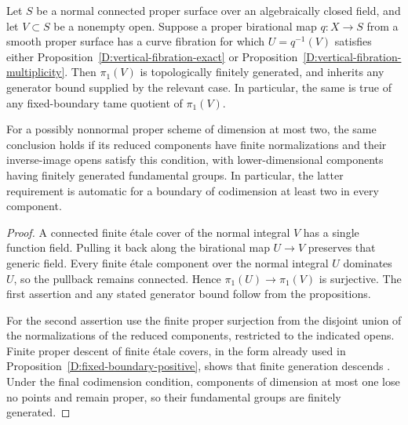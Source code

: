 \begin{corollary}
\label{D:vertical-fibration-models}
Let $S$ be a normal connected proper surface over an
algebraically closed field, and let $V\subset S$ be a nonempty
open.  Suppose a proper birational map $q:X\to S$ from a
smooth proper surface has a curve fibration for which
$U=q^{-1}(V)$ satisfies either
Proposition~\ref{D:vertical-fibration-exact} or
Proposition~\ref{D:vertical-fibration-multiplicity}.
Then $\pi_1(V)$ is topologically finitely generated, and inherits any generator bound supplied by the relevant case.  In particular, the same is
true of any fixed-boundary tame quotient of $\pi_1(V)$.

For a possibly nonnormal proper scheme of dimension at most
two, the same conclusion holds if its reduced components have
finite normalizations and their inverse-image opens satisfy
this condition, with lower-dimensional components having
finitely generated fundamental groups.  In particular, the
latter requirement is automatic for a boundary of codimension
at least two in every component.
\end{corollary}
\begin{proof}
A connected finite \'etale cover of the normal integral $V$
has a single function field.  Pulling it back along the
birational map $U\to V$ preserves that generic field.  Every
finite \'etale component over the normal integral $U$
dominates $U$, so the pullback remains connected.  Hence
$\pi_1(U)\to\pi_1(V)$ is surjective.  The first assertion and any stated generator bound follow from the propositions.

For the second assertion use the finite proper surjection
from the disjoint union of the normalizations of the reduced
components, restricted to the indicated opens.  Finite proper
descent of finite \'etale covers, in the form already used in
Proposition~\ref{D:fixed-boundary-positive}, shows that finite
generation descends
\cite[IX, Corollary 5.2]{SGA1}.  Under the final codimension
condition, components of dimension at most one lose no points
and remain proper, so their fundamental groups are finitely
generated.
\end{proof}
